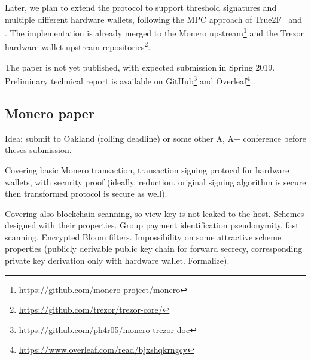 \documentclass[
  digital, %
  twoside, %
  table,   %
  lof,     %
  lot,     %
]{fithesis3}
\theoremstyle{definition}
\theoremstyle{remark}
\begin{document}
Later, we plan to extend the protocol to support threshold signatures and multiple different hardware wallets, following the MPC approach of True2F~\cite{DCMBR18} and 
\cite{2017-ccs-mavroudis}. The implementation is already merged to the Monero upstream\footnote{\url{https://github.com/monero-project/monero}} and the Trezor hardware wallet upstream repositories\footnote{\url{https://github.com/trezor/trezor-core/}}.

The paper is not yet published, with expected submission in Spring 2019. 
Preliminary technical report is available on GitHub\footnote{\url{https://github.com/ph4r05/monero-trezor-doc}} and Overleaf\footnote{\url{https://www.overleaf.com/read/bjxshqkrngcy}} \cite{trezor_monero_tech}.

\begin{ecmmnt}\subsection{Monero paper}

Idea: submit to Oakland (rolling deadline) or some other A, A+ conference before theses submission. 

Covering basic Monero transaction, transaction signing protocol for hardware wallets, with security proof (ideally. reduction. original signing algorithm is secure then transformed protocol is secure as well).

Covering also blockchain scanning, so view key is not leaked to the host. Schemes designed with their properties. Group payment identification pseudonymity, fast scanning. Encrypted Bloom filters. Impossibility on some attractive scheme properties (publicly derivable public key chain for forward secrecy, corresponding private key derivation only with hardware wallet. Formalize). 
\end{ecmmnt}
\end{document}
